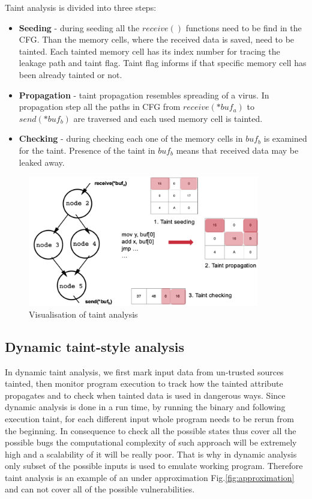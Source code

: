 \documentclass[a4paper, 12pt, journal, onecolumn]{IEEEtran}
\begin{document}
Taint analysis is divided into three steps:\\
\begin{itemize}
\item \textbf{Seeding} - during seeding all the $receive()$ functions need to be find in the CFG. Than the memory cells, where the received data is saved, need to be tainted. Each tainted memory cell has its index number for tracing the leakage path and taint flag. Taint flag informs if that specific memory cell has been already tainted or not.\\
\item \textbf{Propagation} - taint propagation resembles spreading of a virus. In propagation step all the paths in CFG from $receive(*buf_a)$ to $send(*buf_b)$ are traversed and each used memory cell is tainted.\\
\item \textbf{Checking} - during checking each one of the memory cells in $buf_b$ is examined for the taint. Presence of the taint in $buf_b$ means that received data may be leaked away.\\
\end{itemize}

\begin{figure}[ht]
    \centering
    \captionsetup{justification=centering}
    \includegraphics[width=0.9\textwidth]{Taint.png}
    \caption{Visualisation of taint analysis}
    \label{fig:taint}
\end{figure}

\subsection{Dynamic taint-style analysis}

In dynamic taint analysis, we first mark input data from un-trusted sources tainted, then monitor program execution to track how the tainted attribute propagates and to check when tainted data is used in dangerous ways. \cite{taint2}
Since dynamic analysis is done in a run time, by running the binary and following execution taint, for each different input whole program needs to be rerun from the beginning. In consequence to check all the possible states thus cover all the possible bugs the computational complexity of such approach will be extremely high and a scalability of it will be really poor. That is why in dynamic analysis only subset of the possible inputs is used to emulate working program. Therefore taint analysis is an example of an under approximation Fig.\ref{fig:approximation} and can not cover all of the possible vulnerabilities. \cite{a6}\cite{a7}
\end{document}
